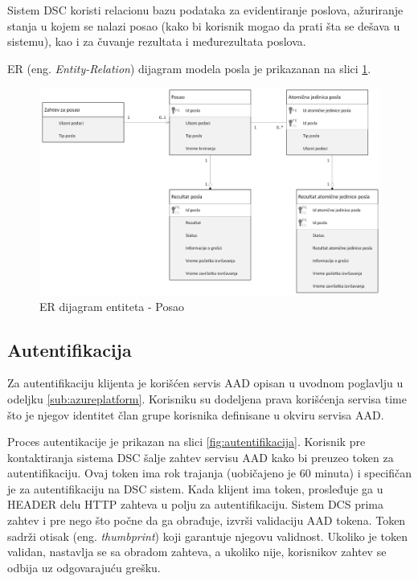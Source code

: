 \documentclass[12pt,oneside]{memoir}
\begin{document}
Sistem DSC koristi relacionu bazu podataka za evidentiranje poslova, ažuriranje stanja u kojem se nalazi posao (kako bi korisnik mogao da prati šta se dešava u sistemu), kao i za čuvanje rezultata i međurezultata poslova. 

ER (eng. \emph{Entity-Relation}) dijagram modela posla je prikazanan na slici \ref{fig:erposao}.

\begin{figure}[!ht]
  \centering
  \includegraphics[width=1.0\textwidth]{./images/uml_er_dijagram_posao.png}
  \caption{ER dijagram entiteta - Posao}
  \label{fig:erposao}
\end{figure}


\subsection{Autentifikacija}

Za autentifikaciju klijenta je korišćen servis AAD \cite{AAD} opisan u uvodnom poglavlju u odeljku \ref{sub:azureplatform}. Korisniku su dodeljena prava korišćenja servisa time što je njegov identitet član grupe korisnika definisane u okviru servisa AAD.

Proces autentikacije je prikazan na slici \ref{fig:autentifikacija}. Korisnik pre kontaktiranja sistema DSC šalje zahtev servisu AAD kako bi preuzeo token za autentifikaciju. Ovaj token ima rok trajanja (uobičajeno je 60 minuta) i specifičan je za autentifikaciju na DSC sistem. Kada klijent ima token, prosleđuje ga u HEADER delu HTTP zahteva u polju za autentifikaciju. Sistem DCS prima zahtev i pre nego što počne da ga obrađuje, izvrši validaciju AAD tokena. Token sadrži otisak (eng. \emph{thumbprint}) koji garantuje njegovu validnost. Ukoliko je token validan, nastavlja se sa obradom zahteva, a ukoliko nije, korisnikov zahtev se odbija uz odgovarajuću grešku.
\end{document}
